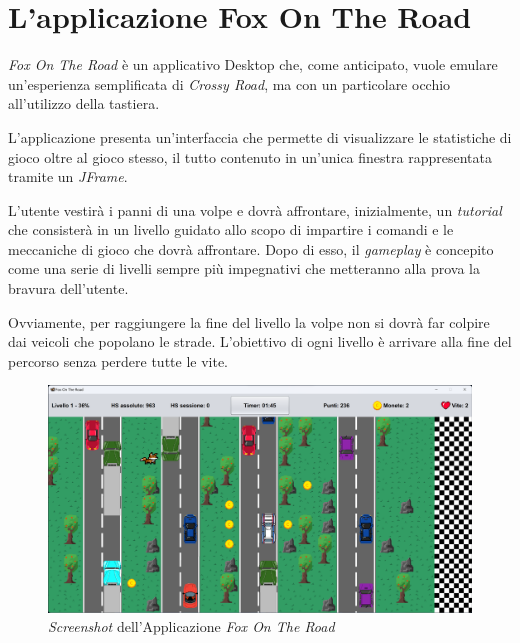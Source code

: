 \documentclass[12pt,a4paper]{report}
\begin{document}
\section{L'applicazione Fox On The Road}\label{se:appjgal}
\emph{Fox On The Road} è un applicativo Desktop che, come anticipato, vuole emulare un'esperienza semplificata di \emph{Crossy Road}, ma con un particolare occhio all'utilizzo della tastiera.

L'applicazione presenta un'interfaccia che permette di visualizzare le statistiche di gioco oltre al gioco stesso, il tutto contenuto in un'unica finestra rappresentata tramite un \emph{JFrame}.

L'utente vestirà i panni di una volpe e dovrà affrontare, inizialmente, un \emph{tutorial} che consisterà in un livello guidato allo scopo di impartire i comandi e le meccaniche di gioco che dovrà affrontare.
Dopo di esso, il \emph{gameplay} è concepito come una serie di livelli sempre più impegnativi che metteranno alla prova la bravura dell'utente.

Ovviamente, per raggiungere la fine del livello la volpe non si dovrà far colpire dai veicoli che popolano le strade.
L'obiettivo di ogni livello è arrivare alla fine del percorso senza perdere tutte le vite.

\begin{figure}[H]
	\centering
	\includegraphics[width=1\textwidth, trim=2 2 2 2, clip]{GeneralGUI.png}
	\caption{\emph{Screenshot} dell'Applicazione \emph{Fox On The Road}}
	\label{fig:Screenshot}
\end{figure}

\end{document}
